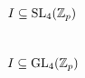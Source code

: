 \section{\texorpdfstring{$I \subseteq \operatorname{SL}_{4}(\mathbb{Z}_{p})$}{I in SL4(Zp)}}%
\label{sec:SL4-calc}

\section{\texorpdfstring{$I \subseteq \operatorname{GL}_{4}(\mathbb{Z}_{p})$}{I in GL4(Zp)}}%
\label{sec:GL4-calc}



